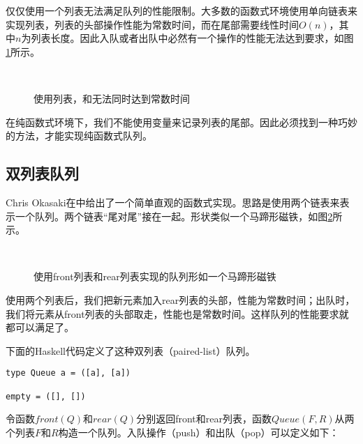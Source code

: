 \documentclass[UTF8]{article}
\begin{document}
仅仅使用一个列表无法满足队列的性能限制。大多数的函数式环境使用单向链表来实现列表，列表的头部操作性能为常数时间，而在尾部需要线性时间$O(n)$，其中$n$为列表长度。因此入队或者出队中必然有一个操作的性能无法达到要求，如图\ref{fig:linked-list-queue}所示。

\begin{figure}[htbp]
  \centering
   \\
  \caption{使用列表，和无法同时达到常数时间} \label{fig:linked-list-queue}
\end{figure}

在纯函数式环境下，我们不能使用变量来记录列表的尾部。因此必须找到一种巧妙的方法，才能实现纯函数式队列。

\subsection{双列表队列}

Chris Okasaki在\cite{okasaki-book}中给出了一个简单直观的函数式实现。思路是使用两个链表来表示一个队列。两个链表“尾对尾”接在一起。形状类似一个马蹄形磁铁，如图\ref{fig:horseshoe-magnet}所示。

\begin{figure}[htbp]
  \centering
   \\
  \caption{使用front列表和rear列表实现的队列形如一个马蹄形磁铁} \label{fig:horseshoe-magnet}
\end{figure}

使用两个列表后，我们把新元素加入rear列表的头部，性能为常数时间；出队时，我们将元素从front列表的头部取走，性能也是常数时间。这样队列的性能要求就都可以满足了。

下面的Haskell代码定义了这种双列表（paired-list）队列。

\lstset{language=Haskell}
\begin{lstlisting}[style=Haskell]
type Queue a = ([a], [a])

empty = ([], [])
\end{lstlisting}

令函数$front(Q)$和$rear(Q)$分别返回front和rear列表，函数$Queue(F, R)$从两个列表$F$和$R$构造一个队列。入队操作（push）和出队（pop）可以定义如下：
\end{document}
